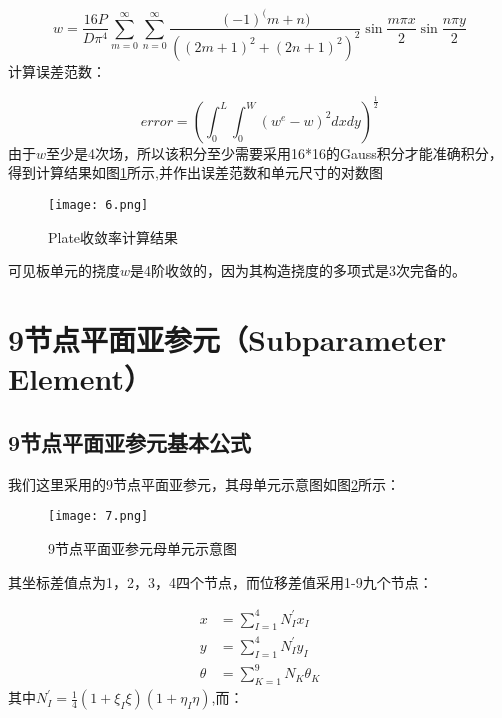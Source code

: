 \documentclass[forprint]{WHUBachelor}
\begin{document}
\begin{equation}
w=\frac{16P}{D\pi^{4}}\sum_{m=0}^{\infty}\sum_{n=0}^{\infty}\frac{(-1)^{(}m+n)}{\left((2m+1)^{2}+(2n+1)^{2}\right)^{2}}\sin\frac{m\pi x}{2}\sin\frac{n\pi y}{2}\label{eq20}
\end{equation}
计算误差范数：

\begin{equation}
error=(\int_{0}^{L}\int_{0}^{W}(w^{e}-w)^{2}dxdy)^{\frac{1}{2}}\label{eq21}
\end{equation}
由于$w$至少是4次场，所以该积分至少需要采用16{*}16的Gauss积分才能准确积分，得到计算结果如图\ref{f6}所示,并作出误差范数和单元尺寸的对数图

\begin{figure}[H]
\centering  
\texttt{[image: 6.png]} 
\caption{Plate收敛率计算结果} 
\label{f6} 
\end{figure}可见板单元的挠度$w$是4阶收敛的，因为其构造挠度的多项式是3次完备的。

\section{9节点平面亚参元（Subparameter Element）}

\subsection{9节点平面亚参元基本公式}

我们这里采用的9节点平面亚参元，其母单元示意图如图\ref{f7}所示：

\begin{figure}[H]
\centering  
\texttt{[image: 7.png]} 
\caption{9节点平面亚参元母单元示意图} 
\label{f7} 
\end{figure}其坐标差值点为1，2，3，4四个节点，而位移差值采用1-9九个节点：

\begin{equation}
\begin{aligned}x & =\sum_{I=1}^{4}N_{I}^{\prime}x_{I}\\
y & =\sum_{I=1}^{4}N_{I}^{\prime}y_{I}\\
\theta & =\sum_{K=1}^{9}N_{K}\theta_{K}
\end{aligned}
\label{eq22}
\end{equation}
其中$N_{I}^{\prime}=\frac{1}{4}\left(1+\xi_{I}\xi\right)\left(1+\eta_{I}\eta\right)$,而：
\end{document}
